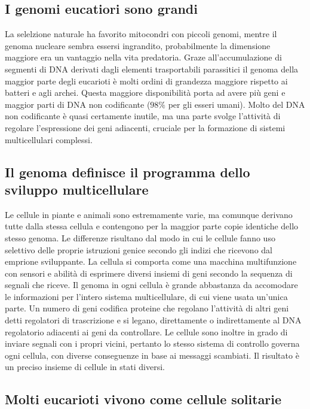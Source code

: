 \subsection{I genomi eucatiori sono grandi}
La selelzione naturale ha favorito mitocondri con piccoli genomi, mentre il genoma nucleare sembra essersi ingrandito, probabilmente la dimensione maggiore era un vantaggio nella vita
predatoria. Graze all'accumulazione di segmenti di DNA derivati dagli elementi trasportabili parassitici il genoma della maggior parte degli eucarioti \`e molti ordini di grandezza 
maggiore rispetto ai batteri e agli archei. Questa maggiore disponibilit\`a porta ad avere pi\`u geni e maggior parti di DNA non codificante ($98\%$ per gli esseri umani).
Molto del DNA non codificante \`e quasi certamente inutile, ma una parte svolge l'attivit\`a di regolare l'espressione dei geni adiacenti, cruciale per la formazione di sistemi 
multicellulari complessi. 
\subsection{Il genoma definisce il programma dello sviluppo multicellulare}
Le cellule in piante e animali sono estremamente varie, ma comunque derivano tutte dalla stessa cellula e contengono per la maggior parte copie identiche dello stesso genoma. Le 
differenze risultano dal modo in cui le cellule fanno uso selettivo delle proprie istruzioni genice secondo gli indizi che ricevono dal emprione sviluppante. La cellula si comporta come
una macchina multifunzione con sensori e abilit\`a di esprimere diversi insiemi di geni secondo la sequenza di segnali che riceve. Il genoma in ogni cellula \`e grande abbastanza da
accomodare le informazioni per l'intero sistema multicellulare, di cui viene usata un'unica parte. Un numero di geni codifica proteine che regolano l'attivit\`a di altri geni detti
regolatori di trascrizione e si legano, direttamente o indirettamente al DNA regolatorio adiacenti ai geni da controllare. Le cellule sono inoltre in grado di inviare segnali con i 
propri vicini, pertanto lo stesso sistema di controllo governa ogni cellula, con diverse conseguenze in base ai messaggi scambiati. Il risultato \`e un preciso insieme di cellule in 
stati diversi. 
\subsection{Molti eucarioti vivono come cellule solitarie}

